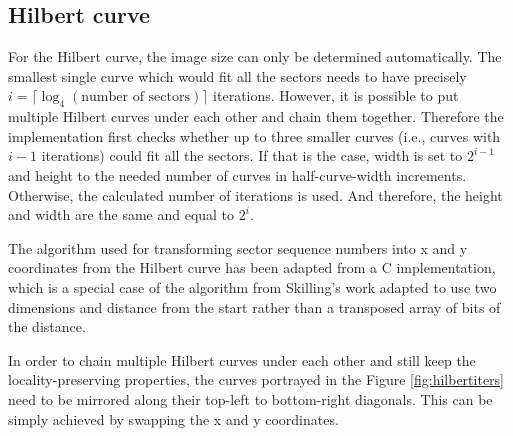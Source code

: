 \documentclass[
  digital, %
  color,   %
  oneside, %
  lof,     %
  nolot,     %
]{fithesis4}
\begin{document}
\subsection{Hilbert curve}
\label{ssec:hilbert-curve}

For the Hilbert curve, the image size can only be determined automatically.
The smallest single curve which would fit all the sectors needs to have precisely $i = \lceil\log_4(\text{number of sectors})\rceil$ iterations.
However, it is possible to put multiple Hilbert curves under each other and chain them together.
Therefore the implementation first checks whether up to three smaller curves (i.e., curves with $i - 1$ iterations) could fit all the sectors.
If that is the case, width is set to $2^{i - 1}$ and height to the needed number of curves in half-curve-width increments.
Otherwise, the calculated number of iterations is used.
And therefore, the height and width are the same and equal to $2^i$.


The algorithm used for transforming sector sequence numbers into x and y coordinates from the Hilbert curve has been adapted from a C implementation,\cite{wikihilbert} which is a special case of the algorithm from Skilling's work\cite{skilling04} adapted to use two dimensions and distance from the start rather than a transposed array of bits of the distance.

In order to chain multiple Hilbert curves under each other and still keep the locality-preserving properties, the curves portrayed in the Figure \ref{fig:hilbertiters} need to be mirrored along their top-left to bottom-right diagonals.
This can be simply achieved by swapping the x and y coordinates.
\end{document}
